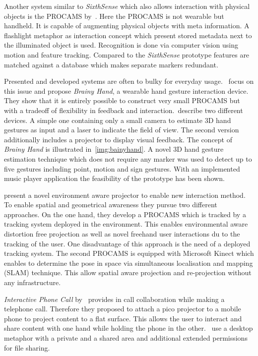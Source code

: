 Another system similar to \textit{SixthSense} which also allows interaction with physical objects is the \ac{PROCAMS} by~\textcite{Mobileprojectorcam:tw}. Here the \ac{PROCAMS} is not wearable but handheld. It is capable of augmenting physical objects with meta information. A flashlight metaphor as interaction concept which present stored metadata next to the illuminated object is used. Recognition is done via computer vision using  motion and feature tracking. Compared to the \textit{SixthSense} prototype features are matched against a database which makes separate markers redundant.

Presented and developed systems are often to bulky for everyday usage.~\textcite{Tamaki:2009hr} focus on this issue and propose \textit{Brainy Hand}, a wearable hand gesture interaction device. They show that it is entirely possible to construct very small PROCAMS but with a tradeoff of flexibility in feedback and interaction.~\citeauthor{Tamaki:2009hr}describe two different devices. A simple one containing only a small camera to estimate 3D hand gestures as input and a laser to indicate the field of view. The second version additionally includes a projector to display visual feedback. The concept of \textit{Brainy Hand} is illustrated in~\autoref{img:bainyhand}. A novel 3D hand gesture estimation technique which does not require any marker was used to detect up to five gestures including point, motion and sign gestures. With an implemented music player application the feasibility of the prototype has been shown.

\textcite{Molyneaux:2012wo} present a novel environment aware projector to enable new interaction method. To enable spatial and geometrical awareness they pursue two different approaches. On the one hand, they develop a \ac{PROCAMS} which is tracked by a tracking system deployed in the environment. This enables environmental aware distortion free projection as well as  novel freehand user interactions du to the tracking of the user. One disadvantage of this approach is the need of a deployed tracking system. The second \ac{PROCAMS} is equipped with Microsoft Kinect which enables to determine the pose in space via simultaneous localisation and mapping (SLAM) technique. This allow spatial aware projection and re-projection without any infrastructure. 

\textit{Interactive Phone Call} by~\textcite{Winkler:2011kk} provides in call collaboration while making a telephone call. Therefore they proposed to attach a pico projector to a mobile phone to project content to a flat surface. This allows the user to interact and share content with one hand while holding the phone in the other.~\citeauthor{Winkler:2011kk} use a desktop metaphor with a private and a shared area and additional extended permissions for file sharing.



